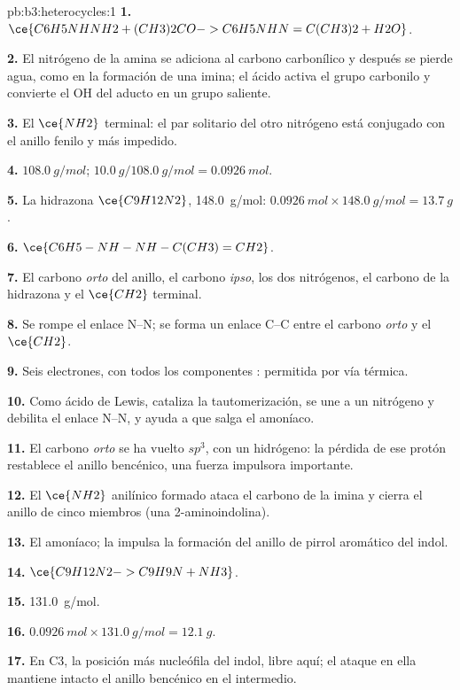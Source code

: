 \begin{solution}{pb:b3:heterocycles:1}
\textbf{1.} $\ce{C6H5NHNH2 + (CH3)2CO -> C6H5NHN=C(CH3)2 + H2O}$.

\textbf{2.} El nitrógeno de la amina se adiciona al carbono carbonílico y después se pierde agua, como en
la formación de una imina; el ácido activa el grupo carbonilo y convierte el OH del aducto
en un grupo saliente.

\textbf{3.} El $\ce{NH2}$ terminal: el par solitario del otro nitrógeno está conjugado con el
anillo fenilo y más impedido.

\textbf{4.} $\qty{108.0}{g/mol}$; $\qty{10.0}{g}/\qty{108.0}{g/mol} = \qty{0.0926}{mol}$.

\textbf{5.} La hidrazona $\ce{C9H12N2}$, \qty{148.0}{g/mol}: $\qty{0.0926}{mol} \times \qty{148.0}{g/mol} = \qty{13.7}{g}$.

\textbf{6.} $\ce{C6H5-NH-NH-C(CH3)=CH2}$.

\textbf{7.} El carbono \textit{orto} del anillo, el carbono \textit{ipso}, los dos nitrógenos, el carbono de la hidrazona
y el $\ce{CH2}$ terminal.

\textbf{8.} Se rompe el enlace N--N; se forma un enlace C--C entre el carbono \textit{orto} y el $\ce{CH2}$.

\textbf{9.} Seis electrones, con todos los componentes : permitida por vía térmica.

\textbf{10.} Como ácido de Lewis, cataliza la tautomerización, se une a un nitrógeno y
debilita el enlace N--N, y ayuda a que salga el amoníaco.

\textbf{11.} El carbono \textit{orto} se ha vuelto $sp^3$, con un hidrógeno: la pérdida de ese protón
restablece el anillo bencénico, una fuerza impulsora importante.

\textbf{12.} El $\ce{NH2}$ anilínico formado ataca el carbono de la imina y cierra el
anillo de cinco miembros (una 2-aminoindolina).

\textbf{13.} El amoníaco; la impulsa la formación del anillo de pirrol aromático del indol.

\textbf{14.} $\ce{C9H12N2 -> C9H9N + NH3}$.

\textbf{15.} \qty{131.0}{g/mol}.

\textbf{16.} $\qty{0.0926}{mol} \times \qty{131.0}{g/mol} = \qty{12.1}{g}$.

\textbf{17.} En C3, la posición más nucleófila del indol, libre aquí; el ataque en ella
mantiene intacto el anillo bencénico en el intermedio.


\end{solution}
